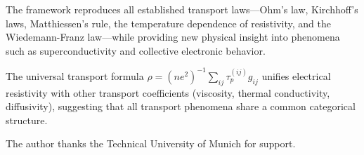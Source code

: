 \documentclass[twocolumn,showpacs,preprintnumbers,amsmath,amssymb,prd]{revtex4-2}
\newcommand{\taup}{\tau_p}
\begin{document}
The framework reproduces all established transport laws---Ohm's law, Kirchhoff's laws, Matthiessen's rule, the temperature dependence of resistivity, and the Wiedemann-Franz law---while providing new physical insight into phenomena such as superconductivity and collective electronic behavior.

The universal transport formula $\rho = (ne^2)^{-1}\sum_{ij}\taup^{(ij)}g_{ij}$ unifies electrical resistivity with other transport coefficients (viscosity, thermal conductivity, diffusivity), suggesting that all transport phenomena share a common categorical structure.

\begin{acknowledgments}
The author thanks the Technical University of Munich for support.
\end{acknowledgments}


\end{document}
